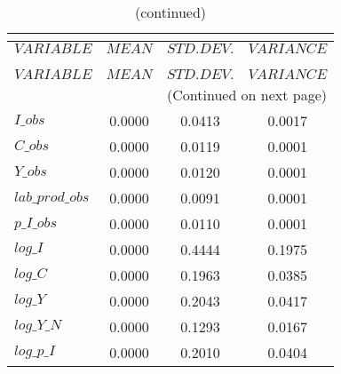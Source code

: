  
\begin{center}
\begin{longtable}{lccc} 
\caption{THEORETICAL MOMENTS}\\
 \label{Table:th_moments}\\
\toprule 
$VARIABLE        $	 & 	 $         MEAN$	 & 	 $    STD. DEV.$	 & 	 $     VARIANCE$\\
\midrule \endfirsthead 
\caption{(continued)}\\
 \toprule \\ 
$VARIABLE        $	 & 	 $         MEAN$	 & 	 $    STD. DEV.$	 & 	 $     VARIANCE$\\
\midrule \endhead 
\midrule \multicolumn{4}{r}{(Continued on next page)} \\ \bottomrule \endfoot 
\bottomrule \endlastfoot 
$I\_obs          $	 & 	       0.0000	 & 	       0.0413	 & 	       0.0017 \\ 
$C\_obs          $	 & 	       0.0000	 & 	       0.0119	 & 	       0.0001 \\ 
$Y\_obs          $	 & 	       0.0000	 & 	       0.0120	 & 	       0.0001 \\ 
$lab\_prod\_obs  $	 & 	       0.0000	 & 	       0.0091	 & 	       0.0001 \\ 
$p\_I\_obs       $	 & 	       0.0000	 & 	       0.0110	 & 	       0.0001 \\ 
$log\_I          $	 & 	       0.0000	 & 	       0.4444	 & 	       0.1975 \\ 
$log\_C          $	 & 	       0.0000	 & 	       0.1963	 & 	       0.0385 \\ 
$log\_Y          $	 & 	       0.0000	 & 	       0.2043	 & 	       0.0417 \\ 
$log\_Y\_N       $	 & 	       0.0000	 & 	       0.1293	 & 	       0.0167 \\ 
$log\_p\_I       $	 & 	       0.0000	 & 	       0.2010	 & 	       0.0404 \\ 
\end{longtable}
 \end{center}
